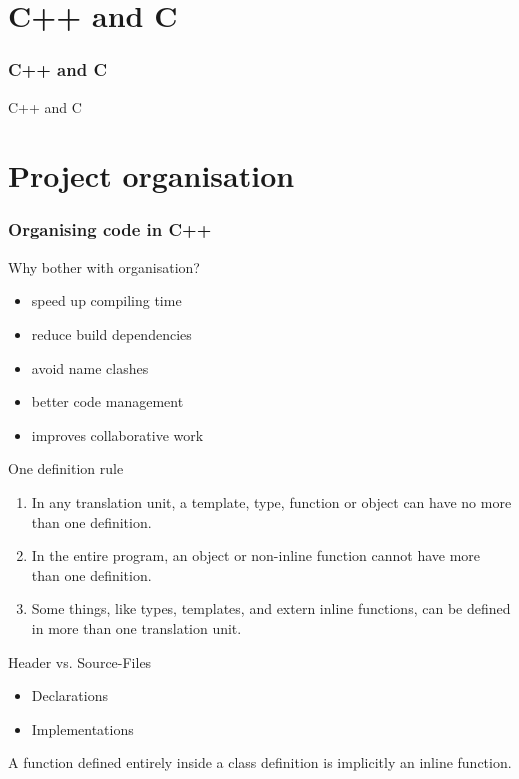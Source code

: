 \documentclass{beamer}
\begin{document}
\part{C++ and C}
\section{C++ and C}
\begin{frame}{C++ and C}
\end{frame}


\part{Project organisation}

\section{Organising code in C++}

\begin{frame}{Why bother with organisation?}
\begin{itemize}
  \item speed up compiling time
  \item reduce build dependencies
  \item avoid name clashes
  \item better code management
  \item improves collaborative work
\end{itemize}
\end{frame}

\begin{frame}{One definition rule}
\begin{enumerate}
  \item In any translation unit, a template, type, function or object can have
  no more than one definition.
  \item In the entire program, an object or non-inline function cannot have more
  than one definition.
  \item Some things, like types, templates, and extern inline functions, can be
  defined in more than one translation unit.
\end{enumerate}
\end{frame}

\begin{frame}{Header vs. Source-Files}
\begin{itemize}
  \item [Header] Declarations
  \item [Source] Implementations 
\end{itemize}
A function defined entirely inside a class definition is implicitly an inline
function.
\end{frame}
\end{document}
